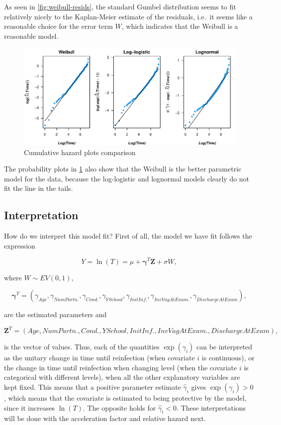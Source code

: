 \documentclass[
]{article}
\begin{document}
As seen in \ref{fig:weibull-resids}, the standard Gumbel distribution seems to fit relatively nicely to the Kaplan-Meier estimate of the residuals, i.e.~it seems like a reasonable choice for the error term \(W\), which indicates that the Weibull is a reasonable model.

\begin{figure}
\centering
\includegraphics{practical_files/figure-latex/cumhaz-plot-1.pdf}
\caption{\label{fig:cumhaz-plot}Cumulative hazard plots comparison}
\end{figure}

The probability plots in \ref{fig:cumhaz-plot} also show that the Weibull is the better parametric model for the data, because the log-logistic and lognormal models clearly do not fit the line in the tails.

\hypertarget{interpretation}{%
\subsection{Interpretation}\label{interpretation}}

How do we interpret this model fit? First of all, the model we have fit follows the expression

\[
Y = \ln(T) = \mu + \mathbf{\gamma}^T\mathbf{Z} + \sigma W,  
\]

where \(W \sim EV(0,1)\),

\[
\mathbf{\gamma}^T = (\gamma_{Age}, \gamma_{NumPartn.}, \gamma_{Cond.}, \gamma_{YSchool}, \gamma_{InitInf.}, \gamma_{InvVagAtExam.}, \gamma_{DischargeAtExam}),
\]

are the estimated parameters and

\[
\mathbf{Z}^T = (Age, NumPartn., Cond., YSchool, InitInf., InvVagAtExam., DischargeAtExam), 
\]

is the vector of values. Thus, each of the quantities \(\exp(\gamma_i)\) can be interpreted as the unitary change in time until reinfection (when covariate \(i\) is continuous), or the change in time until reinfection when changing level (when the covariate \(i\) is categorical with different levels), when all the other explanatory variables are kept fixed. This means that a positive parameter estimate \(\hat{\gamma}_i\) gives \(\exp(\gamma_i) > 0\), which means that the covariate is estimated to being protective by the model, since it increases \(\ln(T)\). The opposite holds for \(\hat{\gamma}_i < 0\). These interpretations will be done with the acceleration factor and relative hazard next.
\end{document}
